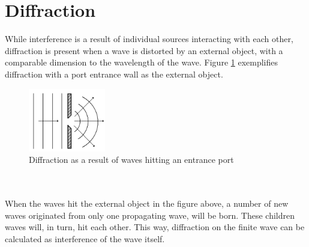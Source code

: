 \section{Diffraction} \label{sec:diffraction}
While interference is a result of individual sources interacting with each other, diffraction is present when a wave is distorted by an external object, with a comparable dimension to the wavelength of the wave. Figure \ref{fig:diffraction} exemplifies diffraction with a port entrance wall as the external object. 
\begin{figure}[h]
    \centering
    \includegraphics[width=0.3\textwidth]{Images/theory/diffraction.png}
    \caption{Diffraction as a result of waves hitting an entrance port}
    \label{fig:diffraction}
\end{figure}
\\\\
When the waves hit the external object in the figure above, a number of new waves originated from only one propagating wave, will be born. These children waves will, in turn, hit each other. This way, diffraction on the finite wave can be calculated as interference of the wave itself.


